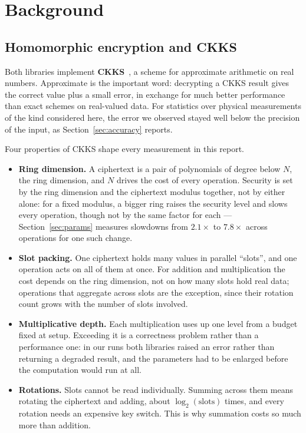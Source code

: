 \documentclass[11pt,a4paper]{article}
\begin{document}
\section{Background}\label{sec:background}

\subsection{Homomorphic encryption and CKKS}

Both libraries implement \textbf{CKKS}~\cite{ckks2017}, a scheme for approximate
arithmetic on real numbers. Approximate is the important word: decrypting a CKKS
result gives the correct value plus a small error, in exchange for much better
performance than exact schemes on real-valued data. For statistics over physical
measurements of the kind considered here, the error we observed stayed well below the
precision of the input, as Section~\ref{sec:accuracy} reports.

Four properties of CKKS shape every measurement in this report.

\begin{itemize}
\item \textbf{Ring dimension.} A ciphertext is a pair of polynomials of degree below
$N$, the ring dimension, and $N$ drives the cost of every operation. Security is set
by the ring dimension and the ciphertext modulus together, not by either alone: for
a fixed modulus, a bigger ring raises the security level and slows every operation,
though not by the same factor for each --- Section~\ref{sec:params} measures
slowdowns from $2.1\times$ to $7.8\times$ across operations for one such change.
\item \textbf{Slot packing.} One ciphertext holds many values in parallel
``slots'', and one operation acts on all of them at once. For addition and
multiplication the cost depends on the ring dimension, not on how many slots hold
real data; operations that aggregate across slots are the exception, since their
rotation count grows with the number of slots involved.
\item \textbf{Multiplicative depth.} Each multiplication uses up one level from a
budget fixed at setup. Exceeding it is a correctness problem rather than a
performance one: in our runs both libraries raised an error rather than returning a
degraded result, and the parameters had to be enlarged before the computation would
run at all.
\item \textbf{Rotations.} Slots cannot be read individually. Summing across them
means rotating the ciphertext and adding, about $\log_2(\text{slots})$ times, and
every rotation needs an expensive key switch. This is why summation costs so much
more than addition.
\end{itemize}
\end{document}
